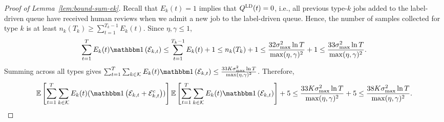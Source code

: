 \begin{proof}[Proof of Lemma~\ref{lem:bound-sum-ek}]
Recall that $E_k(t)=1$ implies that $Q^{\mathcal{\textsc{LD}}}(t) = 0$, i.e., all previous type-$k$ jobs added to the label-driven queue have received human reviews when we admit a new job to the label-driven queue. Hence, the number of samples collected for type $k$ is at least $n_k(T_k) \geq \sum_{t=1}^{T_k-1} E_k(t)$. Since $\eta, \gamma \leq 1$,
\[
\sum_{t=1}^T E_k(t)\indic{\set{E}_{k,t}} \leq \sum_{t=1}^{T_k-1} E_k(t) + 1 \leq n_k(T_k) + 1 \leq \frac{32\sigma_{\max}^2\ln T}{\max(\eta,\gamma)^2} + 1 \leq \frac{33\sigma_{\max}^2\ln T}{\max(\eta,\gamma)^2}.
\]
Summing across all types gives $\sum_{t=1}^T\sum_{k\in\set{K}} E_k(t)\indic{\set{E}_{k,t}} \leq \frac{33K\sigma^2_{\max}\ln T}{\max(\eta,\gamma)^2}$. Therefore,
\[
\expect{\sum_{t=1}^T\sum_{k \in \set{K}} E_k(t)(\indic{\set{E}_{k,t} + \set{E}_{k,t}^c})}  \expect{\sum_{t=1}^T\sum_{k \in \set{K}} E_k(t)\indic{\set{E}_{k,t}}} + 5 \leq  \frac{33K\sigma^2_{\max}\ln T}{\max(\eta,\gamma)^2} + 5 \leq  \frac{38K\sigma^2_{\max}\ln T}{\max(\eta,\gamma)^2}.
\]
\end{proof}

